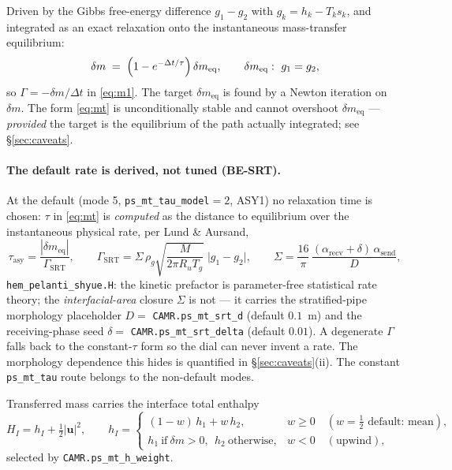 \documentclass[11pt,a4paper]{article}
\newcommand{\uvec}{\mathbf{u}}
\newcommand{\code}[1]{\texttt{\small #1}}
\newcommand{\src}[1]{{\color{gray}\code{#1}}}
\begin{document}
Driven by the Gibbs free-energy difference $g_1-g_2$ with $g_k=h_k-T_ks_k$,
and integrated as an exact relaxation onto the instantaneous mass-transfer
equilibrium:
\begin{equation}
  \delta m \;=\; \Bigl(1-e^{-\Delta t/\tau}\Bigr)\,\delta m_{\mathrm{eq}},
  \qquad
  \delta m_{\mathrm{eq}}:\ g_1 = g_2 ,
  \label{eq:mt}
\end{equation}
so $\Gamma = -\delta m/\Delta t$ in \eqref{eq:m1}.  The target
$\delta m_{\mathrm{eq}}$ is found by a Newton iteration on $\delta m$.  The
form \eqref{eq:mt} is unconditionally stable and cannot overshoot
$\delta m_{\mathrm{eq}}$ --- \emph{provided} the target is the equilibrium of
the path actually integrated; see \S\ref{sec:caveats}.

\paragraph{The default rate is derived, not tuned (BE-SRT).}
At the default (mode 5, \code{ps\_mt\_tau\_model}$=2$, ASY1) no relaxation
time is chosen: $\tau$ in \eqref{eq:mt} is \emph{computed} as the distance
to equilibrium over the instantaneous physical rate, per Lund \& Aursand,
\begin{equation}
  \tau_{\mathrm{asy}} = \frac{|\delta m_{\mathrm{eq}}|}{\Gamma_{\!\mathrm{SRT}}},
  \qquad
  \Gamma_{\!\mathrm{SRT}}
    = \Sigma\,\rho_g\sqrt{\frac{M}{2\pi R_u T_g}}\;\bigl|g_1-g_2\bigr|,
  \qquad
  \Sigma = \frac{16}{\pi}\,
           \frac{(\alpha_{\mathrm{recv}}+\delta)\,\alpha_{\mathrm{send}}}{D},
  \label{eq:srt}
\end{equation}
\src{hem\_pelanti\_shyue.H}: the kinetic prefactor is
parameter-free statistical rate theory; the \emph{interfacial-area} closure
$\Sigma$ is not --- it carries the stratified-pipe morphology placeholder
$D=$ \code{CAMR.ps\_mt\_srt\_d} (default $0.1$~m) and the receiving-phase
seed $\delta=$ \code{CAMR.ps\_mt\_srt\_delta} (default $0.01$).  A
degenerate $\Gamma$ falls back to the constant-$\tau$ form so the dial can
never invent a rate.  The morphology dependence this hides is quantified in
\S\ref{sec:caveats}(ii).  The constant \code{ps\_mt\_tau} route belongs to
the non-default modes.

Transferred mass carries the interface total enthalpy
\begin{equation}
  H_{\!I} = h_{\!I} + \tfrac12|\uvec|^2,
  \qquad
  h_{\!I} =
  \begin{cases}
    (1-w)\,h_1 + w\,h_2, & w \ge 0 \quad(w=\tfrac12 \text{ default: mean}),\\[2pt]
    h_1 \ \text{if}\ \delta m>0,\ \ h_2 \ \text{otherwise}, & w<0 \quad(\text{upwind}),
  \end{cases}
  \label{eq:carrier}
\end{equation}
selected by \code{CAMR.ps\_mt\_h\_weight}.
\end{document}
